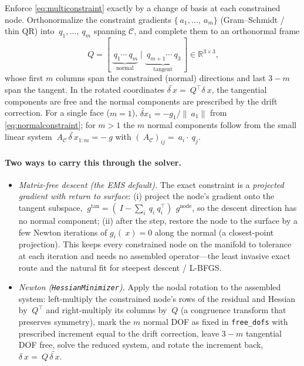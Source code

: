 \documentclass[11pt]{article}
\newcommand{\Real}{\mathbb{R}}
\newcommand{\norm}[1]{\lVert #1 \rVert}
\newcommand{\code}[1]{\texttt{#1}}
\begin{document}
Enforce \eqref{eq:multiconstraint} exactly by a change of basis at each
constrained node. Orthonormalize the constraint gradients
$\{~a_1,\dots,~a_m\}$ (Gram--Schmidt / thin QR) into $~q_1,\dots,~q_m$ spanning
$\mathcal{C}$, and complete them to an orthonormal frame
\begin{equation}
  ~Q = [\,\underbrace{~q_1 \cdots ~q_m}_{\text{normal}}
        \mid \underbrace{~q_{m+1}\cdots ~q_3}_{\text{tangent}}\,]
        \in \Real^{3\times3},
\end{equation}
whose first $m$ columns span the constrained (normal) directions and last $3-m$
span the tangent. In the rotated coordinates $\widetilde{\delta~x} = ~Q^\top
\delta~x$, the tangential components are free and the normal components are
prescribed by the drift correction. For a single face ($m=1$),
$\widetilde{\delta x}_1 = -g_1/\norm{~a_1}$ from \eqref{eq:normalconstraint};
for $m>1$ the $m$ normal components follow from the small linear system
$~A_{\mathcal C}\,\widetilde{\delta~x}_{1:m} = -~g$ with
$(~A_{\mathcal C})_{ij} = ~a_i\cdot~q_j$.

\paragraph{Two ways to carry this through the solver.}
\begin{itemize}
  \item \emph{Matrix-free descent (the EMS default).} The exact constraint is a
  \emph{projected gradient with return to surface}: (i) project the node's
  gradient onto the tangent subspace, $~g^{\mathrm{tan}} = ( ~I - \sum_i
  ~q_i~q_i^\top)\,~g^{\mathrm{node}}$, so the descent direction has no normal
  component; (ii) after the step, restore the node to the surface by a few
  Newton iterations of $g_i(~x)=0$ along the normal (a closest-point
  projection). This keeps every constrained node on the manifold to tolerance
  at each iteration and needs no assembled operator---the least invasive exact
  route and the natural fit for steepest descent / L-BFGS.
  \item \emph{Newton (\code{HessianMinimizer}).} Apply the nodal rotation to the
  assembled system: left-multiply the constrained node's rows of the residual
  and Hessian by $~Q^\top$ and right-multiply its columns by $~Q$ (a congruence
  transform that preserves symmetry), mark the $m$ normal DOF as fixed in
  \code{free\_dofs} with prescribed increment equal to the drift correction,
  leave $3-m$ tangential DOF free, solve the reduced system, and rotate the
  increment back, $\delta~x = ~Q\,\widetilde{\delta~x}$.
\end{itemize}
\end{document}
